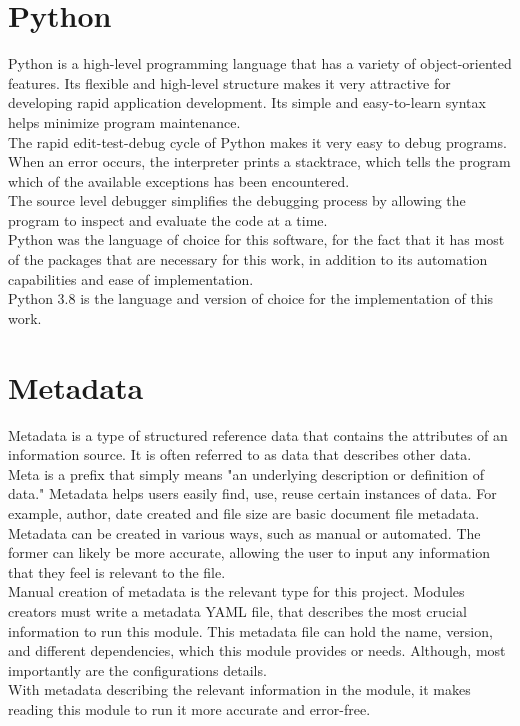 \section{Python}
Python is a high-level programming language that has a variety of object-oriented features. Its flexible and high-level structure makes it very attractive for developing rapid application development. Its simple and easy-to-learn syntax helps minimize program maintenance.\\
The rapid edit-test-debug cycle of Python makes it very easy to debug programs. When an error occurs, the interpreter prints a stacktrace, which tells the program which of the available exceptions has been encountered.\\
The source level debugger simplifies the debugging process by allowing the program to inspect and evaluate the code at a time\cite{python.org}.\\
Python was the language of choice for this software, for the fact that it has most of the packages that are necessary for this work, in addition to its automation capabilities and ease of implementation.\\
Python 3.8 is the language and version of choice for the implementation of this work.


\section{Metadata}
Metadata is a type of structured reference data that contains the attributes of an information source. It is often referred to as data that describes other data.\\
Meta is a prefix that simply means "an underlying description or definition of data." Metadata helps users easily find, use, reuse certain instances of data. For example, author, date created and file size are basic document file metadata.
Metadata can be created in various ways, such as manual or automated. The former can likely be more accurate, allowing the user to input any information that they feel is relevant to the file\cite{Kranz2021Jul}.\\
Manual creation of metadata is the relevant type for this project. Modules creators must write a metadata YAML file, that describes the most crucial information to run this module.
This metadata file can hold the name, version, and different dependencies, which this module provides or needs. Although, most importantly are the configurations details.\\
With metadata describing the relevant information in the module, it makes reading this module to run it more accurate and error-free.


